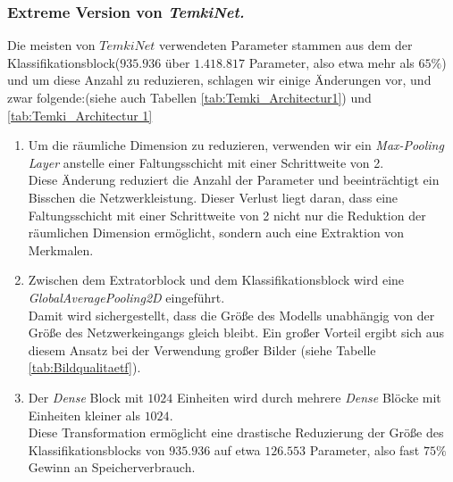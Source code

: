 \documentclass[12pt,a4paper]{scrartcl}
\numberwithin{equation}{section}
\begin{document}
\subsubsection{Extreme Version von \textit{TemkiNet.}}\label{Extrem}
Die meisten von $ TemkiNet $ verwendeten Parameter stammen aus dem der Klassifikationsblock($ 935.936 $ über $ 1.418.817 $ Parameter, also etwa mehr als $65\%  $) und um diese Anzahl zu reduzieren, schlagen wir einige Änderungen vor, und zwar folgende:(siehe auch Tabellen \ref{tab:Temki_Architectur1}) und \ref{tab:Temki_Architectur 1}
\begin{enumerate}
	\item Um die räumliche Dimension zu reduzieren, verwenden wir ein \textit{Max-Pooling Layer} anstelle einer Faltungsschicht mit einer Schrittweite von 2. \\
	Diese Änderung reduziert die Anzahl der Parameter und beeinträchtigt ein Bisschen die Netzwerkleistung. Dieser Verlust liegt daran, dass eine Faltungsschicht mit einer Schrittweite von 2 nicht nur die Reduktion der räumlichen Dimension ermöglicht, sondern auch eine Extraktion von Merkmalen.
	\item Zwischen dem Extratorblock und dem Klassifikationsblock wird eine \textit{GlobalAveragePooling2D} eingeführt. \\
	 Damit wird sichergestellt, dass  die Größe des Modells unabhängig von der Größe des Netzwerkeingangs gleich bleibt. Ein großer Vorteil ergibt sich aus diesem Ansatz bei der Verwendung großer Bilder (siehe Tabelle \ref{tab:Bildqualitaetf}).
	
	\item Der \textit{Dense} Block mit $ 1024 $ Einheiten wird durch mehrere \textit{Dense} Blöcke mit Einheiten kleiner als $ 1024 $.\\
	Diese Transformation ermöglicht eine drastische Reduzierung der Größe des Klassifikationsblocks von $ 935.936 $ auf etwa $ 126.553 $ Parameter, also fast $ 75\% $ Gewinn an Speicherverbrauch. 
\end{enumerate}
\end{document}
